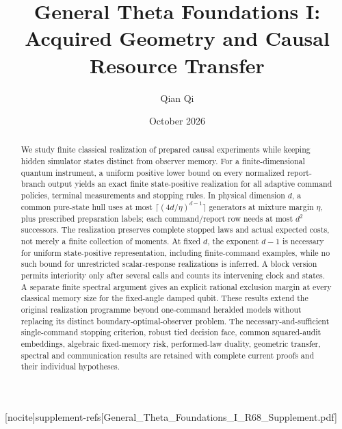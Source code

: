 
[nocite]{supplement-refs}[General_Theta_Foundations_I_R68_Supplement.pdf]
\title[Acquired geometry and causal resource transfer]{General Theta Foundations I:\\Acquired Geometry and Causal Resource Transfer}
\author{Qian Qi}\date{October 2026}

\begin{abstract}
We study finite classical realization of prepared causal experiments while keeping hidden simulator states distinct from observer memory. For a finite-dimensional quantum instrument, a uniform positive lower bound on every normalized report-branch output yields an exact finite state-positive realization for all adaptive command policies, terminal measurements and stopping rules. In physical dimension $d$, a common pure-state hull uses at most $\lceil(4d/\eta)^{d-1}\rceil$ generators at mixture margin $\eta$, plus prescribed preparation labels; each command/report row needs at most $d^2$ successors. The realization preserves complete stopped laws and actual expected costs, not merely a finite collection of moments. At fixed $d$, the exponent $d-1$ is necessary for uniform state-positive representation, including finite-command examples, while no such bound for unrestricted scalar-response realizations is inferred. A block version permits interiority only after several calls and counts its intervening clock and states. A separate finite spectral argument gives an explicit rational exclusion margin at every classical memory size for the fixed-angle damped qubit. These results extend the original realization programme beyond one-command heralded models without replacing its distinct boundary-optimal-observer problem. The necessary-and-sufficient single-command stopping criterion, robust tied decision face, common squared-audit embeddings, algebraic fixed-memory risk, performed-law duality, geometric transfer, spectral and communication results are retained with complete current proofs and their individual hypotheses.
\end{abstract}
\maketitle







